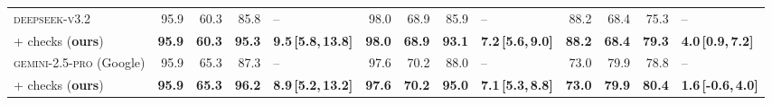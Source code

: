 \begin{table}[t]
\begin{tabular}{@{}l rrr l rrr l rrr l@{}}
\textsc{deepseek-v3.2} & 95.9 & 60.3 & 85.8 & -- & 98.0 & 68.9 & 85.9 & -- & 88.2 & 68.4 & 75.3 & -- \\
\quad + checks (\textbf{ours}) & \textbf{95.9} & \textbf{60.3} & \textbf{95.3} & \textbf{9.5\,[5.8,\,13.8]} & \textbf{98.0} & \textbf{68.9} & \textbf{93.1} & \textbf{7.2\,[5.6,\,9.0]} & \textbf{88.2} & \textbf{68.4} & \textbf{79.3} & \textbf{4.0\,[0.9,\,7.2]} \\
\textsc{gemini-2.5-pro} (Google) & 95.9 & 65.3 & 87.3 & -- & 97.6 & 70.2 & 88.0 & -- & 73.0 & 79.9 & 78.8 & -- \\
\quad + checks (\textbf{ours}) & \textbf{95.9} & \textbf{65.3} & \textbf{96.2} & \textbf{8.9\,[5.2,\,13.2]} & \textbf{97.6} & \textbf{70.2} & \textbf{95.0} & \textbf{7.1\,[5.3,\,8.8]} & \textbf{73.0} & \textbf{79.9} & \textbf{80.4} & \textbf{1.6\,[-0.6,\,4.0]} \\
\bottomrule
\end{tabular}
\vspace{-4pt}
\end{table}
